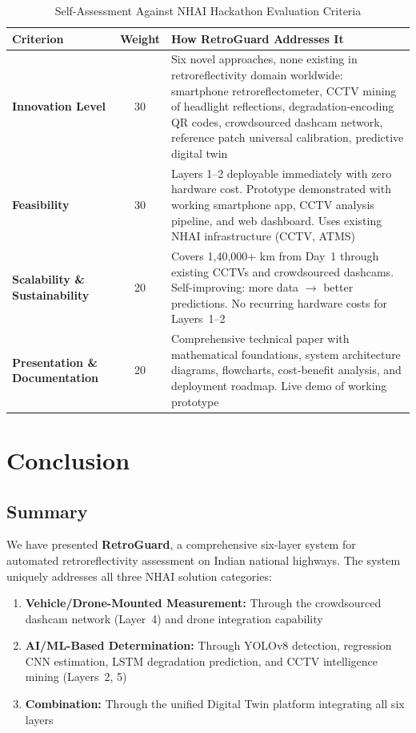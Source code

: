 \documentclass[11pt,a4paper]{article}
\begin{document}
\begin{table}[H]
\centering
\caption{Self-Assessment Against NHAI Hackathon Evaluation Criteria}
\label{tab:evaluation}
\begin{tabular}{@{}p{3.5cm}cp{8.5cm}@{}}
\toprule
\textbf{Criterion} & \textbf{Weight} & \textbf{How RetroGuard Addresses It} \\
\midrule
\textbf{Innovation Level} & 30 & Six novel approaches, none existing in retroreflectivity domain worldwide: smartphone retroreflectometer, CCTV mining of headlight reflections, degradation-encoding QR codes, crowdsourced dashcam network, reference patch universal calibration, predictive digital twin \\
\midrule
\textbf{Feasibility} & 30 & Layers 1--2 deployable immediately with zero hardware cost. Prototype demonstrated with working smartphone app, CCTV analysis pipeline, and web dashboard. Uses existing NHAI infrastructure (CCTV, ATMS) \\
\midrule
\textbf{Scalability \& Sustainability} & 20 & Covers 1,40,000+ km from Day~1 through existing CCTVs and crowdsourced dashcams. Self-improving: more data $\to$ better predictions. No recurring hardware costs for Layers~1--2 \\
\midrule
\textbf{Presentation \& Documentation} & 20 & Comprehensive technical paper with mathematical foundations, system architecture diagrams, flowcharts, cost-benefit analysis, and deployment roadmap. Live demo of working prototype \\
\bottomrule
\end{tabular}
\end{table}


\section{Conclusion}
\label{sec:conclusion}

\subsection{Summary}

We have presented \textbf{RetroGuard}, a comprehensive six-layer system for automated retroreflectivity assessment on Indian national highways. The system uniquely addresses all three NHAI solution categories:

\begin{enumerate}[noitemsep]
    \item \textbf{Vehicle/Drone-Mounted Measurement:} Through the crowdsourced dashcam network (Layer~4) and drone integration capability
    \item \textbf{AI/ML-Based Determination:} Through YOLOv8 detection, regression CNN estimation, LSTM degradation prediction, and CCTV intelligence mining (Layers~2, 5)
    \item \textbf{Combination:} Through the unified Digital Twin platform integrating all six layers
\end{enumerate}
\end{document}
